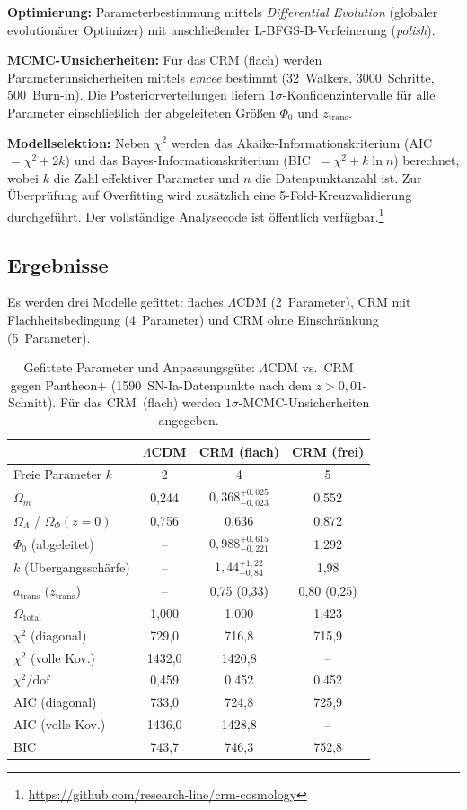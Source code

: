 \documentclass[aps,prd,twocolumn,superscriptaddress,nofootinbib]{revtex4-2}
\begin{document}
\textbf{Optimierung:} Parameterbestimmung mittels \textit{Differential Evolution} (globaler evolutionärer Optimizer) mit anschließender L-BFGS-B-Verfeinerung (\textit{polish}).

\textbf{MCMC-Unsicherheiten:} Für das CRM (flach) werden Parameterunsicherheiten mittels \textit{emcee} \cite{ForemanMackey2013} bestimmt (32~Walkers, 3000~Schritte, 500~Burn-in). Die Posteriorverteilungen liefern $1\sigma$-Konfidenzintervalle für alle Parameter einschließlich der abgeleiteten Größen $\Phi_0$ und $z_{\mathrm{trans}}$.

\textbf{Modellselektion:} Neben $\chi^2$ werden das Akaike-Informationskriterium (AIC~$= \chi^2 + 2k$) und das Bayes-Informationskriterium (BIC~$= \chi^2 + k \ln n$) berechnet, wobei $k$ die Zahl effektiver Parameter und $n$ die Datenpunktanzahl ist. Zur Überprüfung auf Overfitting wird zusätzlich eine 5-Fold-Kreuzvalidierung durchgeführt. Der vollständige Analysecode ist öffentlich verfügbar.\footnote{\url{https://github.com/research-line/crm-cosmology}}

\subsection{Ergebnisse}
\label{subsec:results}

Es werden drei Modelle gefittet: flaches $\Lambda$CDM (2~Parameter), CRM mit Flachheitsbedingung (4~Parameter) und CRM ohne Einschränkung (5~Parameter).

\begin{table}[htbp]
\centering
\caption{Gefittete Parameter und Anpassungsgüte: $\Lambda$CDM vs.\ CRM gegen Pantheon+ (1590~SN-Ia-Datenpunkte nach dem $z>0{,}01$-Schnitt). Für das CRM~(flach) werden $1\sigma$-MCMC-Unsicherheiten angegeben.}
\label{tab:results}
\begin{tabular}{lccc}
\toprule
 & $\Lambda$CDM & CRM (flach) & CRM (frei) \\
\midrule
Freie Parameter $k$ & 2 & 4 & 5 \\
$\Omega_m$ & 0,244 & $0{,}368^{+0{,}025}_{-0{,}023}$ & 0,552 \\
$\Omega_\Lambda$ / $\Omega_\Phi(z{=}0)$ & 0,756 & 0,636 & 0,872 \\
$\Phi_0$ (abgeleitet) & -- & $0{,}988^{+0{,}615}_{-0{,}221}$ & 1,292 \\
$k$ (Übergangsschärfe) & -- & $1{,}44^{+1{,}22}_{-0{,}84}$ & 1,98 \\
$a_{\mathrm{trans}}$ ($z_{\mathrm{trans}}$) & -- & 0,75 (0,33) & 0,80 (0,25) \\
$\Omega_{\mathrm{total}}$ & 1,000 & 1,000 & 1,423 \\
\midrule
$\chi^2$ (diagonal) & 729,0 & 716,8 & 715,9 \\
$\chi^2$ (volle Kov.) & 1432,0 & 1420,8 & -- \\
$\chi^2/\mathrm{dof}$ & 0,459 & 0,452 & 0,452 \\
AIC (diagonal) & 733,0 & 724,8 & 725,9 \\
AIC (volle Kov.) & 1436,0 & 1428,8 & -- \\
BIC & 743,7 & 746,3 & 752,8 \\
\bottomrule
\end{tabular}
\end{table}
\end{document}
